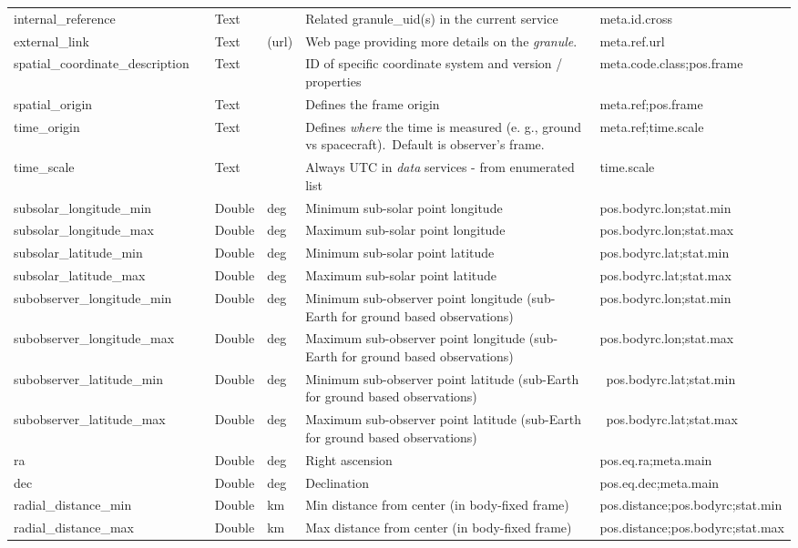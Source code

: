 \documentclass[11pt,a4paper]{ivoa}
\begin{document}
\begin{longtable}{p{3.5cm}p{0.5cm}p{1cm}p{1cm}p{7cm}p{3cm}}
internal\_reference&&Text&&Related granule\_uid(s) in the current service&meta.id.cross\\
external\_link&&Text&(url)&Web page providing more details on the \emph{granule}.&meta.ref.url\\
spatial\_coordinate\_description&&Text&&ID of specific coordinate system and version / properties&meta.code.class;pos.frame\\
spatial\_origin&&Text&&Defines the frame origin&meta.ref;pos.frame\\
time\_origin&&Text&&Defines \emph{where} the time is measured (e. g., ground vs spacecraft). Default is observer's frame.&meta.ref;time.scale\\
time\_scale&&Text&&Always UTC in \emph{data} services - from enumerated list&time.scale\\
subsolar\_longitude\_min&&Double&deg&Minimum sub-solar point longitude&pos.bodyrc.lon;stat.min\\
subsolar\_longitude\_max&&Double&deg&Maximum sub-solar point longitude&pos.bodyrc.lon;stat.max\\
subsolar\_latitude\_min&&Double&deg&Minimum sub-solar point latitude&pos.bodyrc.lat;stat.min\\
subsolar\_latitude\_max&&Double&deg&Maximum sub-solar point latitude&pos.bodyrc.lat;stat.max\\
subobserver\_longitude\_min&&Double&deg&Minimum sub-observer point longitude (sub-Earth for ground based observations)&pos.bodyrc.lon;stat.min\\
subobserver\_longitude\_max&&Double&deg&Maximum sub-observer point longitude (sub-Earth for ground based observations)&pos.bodyrc.lon;stat.max\\
subobserver\_latitude\_min&&Double&deg&Minimum sub-observer point latitude (sub-Earth for ground based observations)& pos.bodyrc.lat;stat.min\\
subobserver\_latitude\_max&&Double&deg&Maximum sub-observer point latitude (sub-Earth for ground based observations)& pos.bodyrc.lat;stat.max\\
ra&&Double&deg&Right ascension&pos.eq.ra;meta.main\\
dec&&Double&deg&Declination&pos.eq.dec;meta.main\\
radial\_distance\_min&&Double&km&Min distance from center (in body-fixed frame)&pos.distance;pos.bodyrc;stat.min\\
radial\_distance\_max&&Double&km&Max distance from center (in body-fixed frame)&pos.distance;pos.bodyrc;stat.max\\

\end{longtable}
\end{document}
